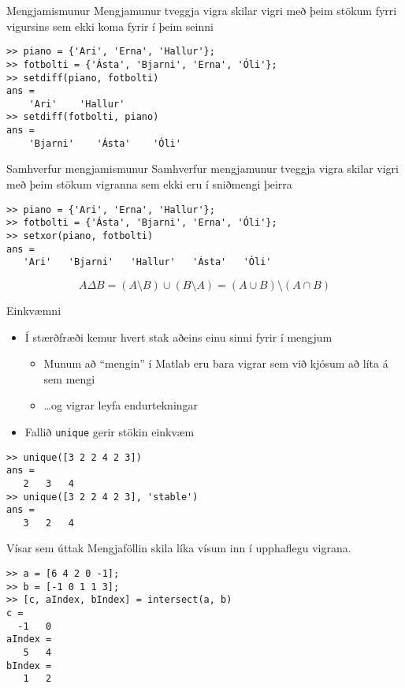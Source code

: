 \documentclass{beamer}
\begin{document}
\begin{frame}[fragile]{Mengjamismunur}
\vspace{\baselineskip}
Mengjamunur tveggja vigra skilar vigri með þeim stökum fyrri vigursins sem ekki koma fyrir í þeim seinni
\begin{verbatim}
>> piano = {'Ari', 'Erna', 'Hallur'};
>> fotbolti = {'Ásta', 'Bjarni', 'Erna', 'Óli'};
>> setdiff(piano, fotbolti)
ans = 
    'Ari'    'Hallur'
>> setdiff(fotbolti, piano)
ans = 
    'Bjarni'    'Ásta'    'Óli'
\end{verbatim}

\end{frame}

\begin{frame}[fragile]{Samhverfur mengjamismunur}
\vspace{\baselineskip}
Samhverfur mengjamunur tveggja vigra skilar vigri með þeim stökum vigranna sem ekki eru í sniðmengi þeirra
\begin{verbatim}
>> piano = {'Ari', 'Erna', 'Hallur'};
>> fotbolti = {'Ásta', 'Bjarni', 'Erna', 'Óli'};
>> setxor(piano, fotbolti)
ans = 
   'Ari'   'Bjarni'   'Hallur'   'Ásta'   'Óli'
\end{verbatim}
\[
A \Delta B = (A \setminus B) \cup (B \setminus A) = (A \cup B) \setminus (A \cap B)
\]
\end{frame}

\begin{frame}[fragile]{Einkvæmni}
\vspace{\baselineskip}
\begin{itemize}
 \item Í stærðfræði kemur hvert stak aðeins einu sinni fyrir í mengjum
 \begin{itemize}
  \item Munum að ``mengin'' í Matlab eru bara vigrar sem við kjósum að líta á sem mengi
  \item \ldots og vigrar leyfa endurtekningar
 \end{itemize}
 \item Fallið \texttt{unique} gerir stökin einkvæm
\end{itemize}
\begin{verbatim}
>> unique([3 2 2 4 2 3])
ans =
   2   3   4
>> unique([3 2 2 4 2 3], 'stable')
ans =
   3   2   4
\end{verbatim}
\end{frame}

\begin{frame}[fragile]{Vísar sem úttak}
\vspace{\baselineskip}
Mengjaföllin skila líka vísum inn í upphaflegu vigrana.
\begin{verbatim}
>> a = [6 4 2 0 -1];     
>> b = [-1 0 1 1 3];
>> [c, aIndex, bIndex] = intersect(a, b)
c =
  -1   0
aIndex =
   5   4
bIndex =
   1   2
\end{verbatim}
\end{frame}
\end{document}
